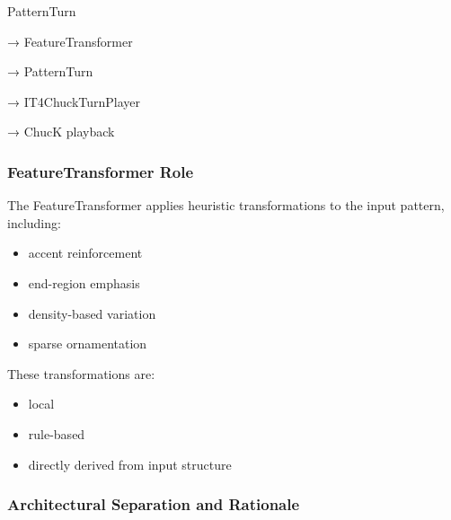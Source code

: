 PatternTurn

→ FeatureTransformer

→ PatternTurn

→ IT4ChuckTurnPlayer

→ ChucK playback

\subsubsection{FeatureTransformer Role}\label{featuretransformer-role}

The FeatureTransformer applies heuristic transformations to the input
pattern, including:

\begin{itemize}
\item
  accent reinforcement
\item
  end-region emphasis
\item
  density-based variation
\item
  sparse ornamentation
\end{itemize}

These transformations are:

\begin{itemize}
\item
  local
\item
  rule-based
\item
  directly derived from input structure
\end{itemize}

\subsubsection{Architectural Separation and
Rationale}\label{architectural-separation-and-rationale}

